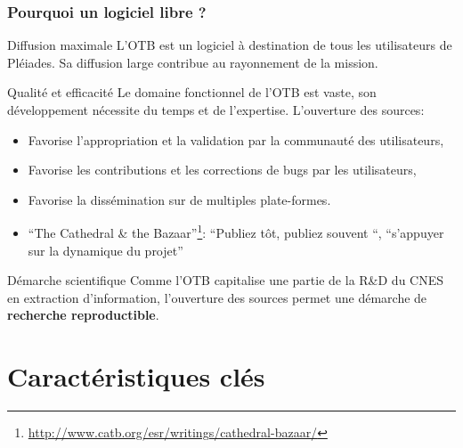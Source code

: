 \documentclass[8pt]{beamer}
\begin{document}
\begin{frame}
\frametitle{Pourquoi un logiciel libre ?}

\begin{block}{Diffusion maximale}
L'OTB est un logiciel à destination de tous les utilisateurs de Pléiades. Sa diffusion large contribue au rayonnement de la mission.
\end{block}

\begin{block}{Qualité et efficacité}
Le domaine fonctionnel de l'OTB est vaste, son développement nécessite du temps et de l'expertise. L'ouverture des sources:
\begin{itemize}
\item Favorise l'appropriation et la validation par la communauté des utilisateurs,
\item Favorise les contributions et les corrections de bugs par les utilisateurs,
\item Favorise la dissémination sur de multiples plate-formes.  
\item ``The Cathedral \& the
  Bazaar''\footnote{\url{http://www.catb.org/esr/writings/cathedral-bazaar/}}:
  ``Publiez tôt, publiez souvent ``, ``s'appuyer sur la dynamique du projet''

\end{itemize}
\end{block}

\begin{block}{Démarche scientifique}
Comme l'OTB capitalise une partie de la R\&D du CNES en extraction d'information, l'ouverture des sources permet une démarche de \textbf{recherche reproductible}.
\end{block}

\end{frame}

\section{Caractéristiques clés}
\end{document}
